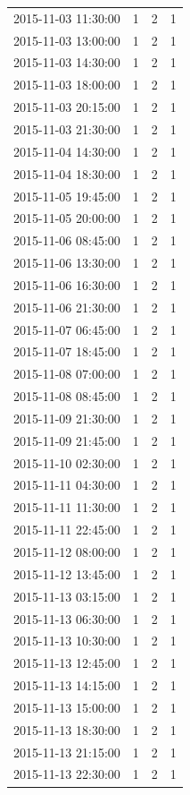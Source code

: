 \begin{tabular}{lrrr}
2015-11-03 11:30:00 & 1 & 2 & 1 \\
2015-11-03 13:00:00 & 1 & 2 & 1 \\
2015-11-03 14:30:00 & 1 & 2 & 1 \\
2015-11-03 18:00:00 & 1 & 2 & 1 \\
2015-11-03 20:15:00 & 1 & 2 & 1 \\
2015-11-03 21:30:00 & 1 & 2 & 1 \\
2015-11-04 14:30:00 & 1 & 2 & 1 \\
2015-11-04 18:30:00 & 1 & 2 & 1 \\
2015-11-05 19:45:00 & 1 & 2 & 1 \\
2015-11-05 20:00:00 & 1 & 2 & 1 \\
2015-11-06 08:45:00 & 1 & 2 & 1 \\
2015-11-06 13:30:00 & 1 & 2 & 1 \\
2015-11-06 16:30:00 & 1 & 2 & 1 \\
2015-11-06 21:30:00 & 1 & 2 & 1 \\
2015-11-07 06:45:00 & 1 & 2 & 1 \\
2015-11-07 18:45:00 & 1 & 2 & 1 \\
2015-11-08 07:00:00 & 1 & 2 & 1 \\
2015-11-08 08:45:00 & 1 & 2 & 1 \\
2015-11-09 21:30:00 & 1 & 2 & 1 \\
2015-11-09 21:45:00 & 1 & 2 & 1 \\
2015-11-10 02:30:00 & 1 & 2 & 1 \\
2015-11-11 04:30:00 & 1 & 2 & 1 \\
2015-11-11 11:30:00 & 1 & 2 & 1 \\
2015-11-11 22:45:00 & 1 & 2 & 1 \\
2015-11-12 08:00:00 & 1 & 2 & 1 \\
2015-11-12 13:45:00 & 1 & 2 & 1 \\
2015-11-13 03:15:00 & 1 & 2 & 1 \\
2015-11-13 06:30:00 & 1 & 2 & 1 \\
2015-11-13 10:30:00 & 1 & 2 & 1 \\
2015-11-13 12:45:00 & 1 & 2 & 1 \\
2015-11-13 14:15:00 & 1 & 2 & 1 \\
2015-11-13 15:00:00 & 1 & 2 & 1 \\
2015-11-13 18:30:00 & 1 & 2 & 1 \\
2015-11-13 21:15:00 & 1 & 2 & 1 \\
2015-11-13 22:30:00 & 1 & 2 & 1 \\

\end{tabular}
